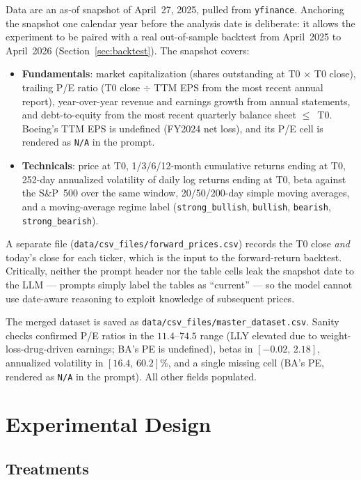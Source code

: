 \documentclass[11pt]{article}
\begin{document}
Data are an as-of snapshot of April~27, 2025, pulled from
\texttt{yfinance}. Anchoring the snapshot one calendar year before the
analysis date is deliberate: it allows the experiment to be paired with a
real out-of-sample backtest from April~2025 to April~2026
(Section~\ref{sec:backtest}).
The snapshot covers:
\begin{itemize}
\item \textbf{Fundamentals}: market capitalization (shares outstanding at
T0 $\times$ T0 close), trailing P/E ratio (T0 close $\div$ TTM EPS from
the most recent annual report), year-over-year revenue and earnings growth
from annual statements, and debt-to-equity from the most recent quarterly
balance sheet $\le$~T0. Boeing's TTM EPS is undefined (FY2024 net loss),
and its P/E cell is rendered as \texttt{N/A} in the prompt.
\item \textbf{Technicals}: price at T0, 1/3/6/12-month cumulative returns
ending at T0, 252-day annualized volatility of daily log returns ending at
T0, beta against the S\&P~500 over the same window, 20/50/200-day simple
moving averages, and a moving-average regime label
(\texttt{strong\_bullish}, \texttt{bullish}, \texttt{bearish},
\texttt{strong\_bearish}).
\end{itemize}
A separate file (\texttt{data/csv\_files/forward\_prices.csv}) records the
T0 close \emph{and} today's close for each ticker, which is the input to
the forward-return backtest. Critically, neither the prompt header nor the
table cells leak the snapshot date to the LLM --- prompts simply label the
tables as ``current'' --- so the model cannot use date-aware reasoning to
exploit knowledge of subsequent prices.

The merged dataset is saved as \texttt{data/csv\_files/master\_dataset.csv}.
Sanity checks confirmed P/E ratios in the $11.4$--$74.5$ range (LLY
elevated due to weight-loss-drug-driven earnings; BA's PE is undefined),
betas in $[-0.02,\, 2.18]$, annualized volatility in $[16.4,\, 60.2]\%$,
and a single missing cell (BA's PE, rendered as \texttt{N/A} in the
prompt). All other fields populated.

\section{Experimental Design}

\subsection{Treatments}
\end{document}
